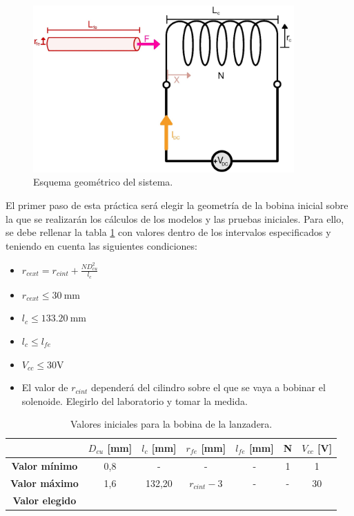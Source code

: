 \begin{figure}[H]
    \centering 
    \includegraphics[width=10cm]{FigurasMemoria/esquemaDesTeor.jpg}
    \caption{Esquema geométrico del sistema.}
    \label{fig:esquemaGeomPractica} %
\end{figure}

El primer paso de esta práctica será elegir la geometría de la bobina inicial sobre la que se realizarán los cálculos de los modelos y las pruebas iniciales. Para ello, se debe rellenar la tabla \ref{tab:bobIniPractica} con valores dentro de los intervalos especificados y teniendo en cuenta las siguientes condiciones:

\begin{itemize}
    \item \(r_{cext} = r_{cint} + \frac{ND_{cu}^2}{l_c}\)
    \item \(r_{cext} \leq 30~\text{mm}\)
    \item \(l_c \leq 133.20~\text{mm}\)
    \item \(l_c \leq l_{fe}\)
    \item \(V_{cc} \leq 30\)V
    \item El valor de \(r_{cint}\) dependerá del cilindro sobre el que se vaya a bobinar el solenoide. Elegirlo del laboratorio y tomar la medida.
\end{itemize}

\begin{table}[H]
    \centering
    \setlength{\tabcolsep}{5pt}
    \renewcommand{\arraystretch}{1.2}
    \begin{tabular}{|c|c|c|c|c|c|c|}
        \hline
        \hbox{} & \textbf{\(D_{cu}\) [mm]} & \textbf{\(l_c\) [mm]} & \textbf{\(r_{fe}\) [mm]} & \textbf{\(l_{fe}\) [mm]} & \textbf{N} & \textbf{\(V_{cc}\) [V]} \\
        \hline
        \textbf{Valor mínimo} & 0,8 & - & - & - & 1 & 1 \\
        \textbf{Valor máximo} & 1,6 & 132,20 & \(r_{cint}-3\) & - & - & 30 \\
        \hline
        \textbf{Valor elegido} &  &  &  &  &  &  \\
        \hline
    \end{tabular}
    \caption{Valores iniciales para la bobina de la lanzadera.}
    \label{tab:bobIniPractica}
\end{table}


